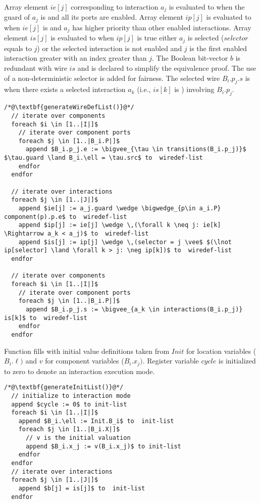 Array element $\mathit{ie}[j]$ corresponding to interaction $a_j$ is evaluated to \true when the guard of $a_j$ is \true and all its ports are enabled.
Array element $ip[j]$ is evaluated to \true when $ie[j]$ is \true and $a_j$ has higher priority than other enabled interactions. 
Array element $is[j]$ is evaluated to \true when $ip[j]$ is true either $a_j$ is selected ($selector$ equals to $j$) or the selected interaction is not enabled and $j$ is the first enabled interaction greater with an index greater than $j$. 
The Boolean bit-vector $b$ is redundant with wire $is$ and is declared to simplify the equivalence proof. 
The use of a non-deterministic selector is added for fairness. 
The selected wire $B_i.p_j.s$ is \true when there exists a selected interaction $a_k$ (i.e., $is[k]$ is \true) involving $B_i.p_j$.
%
\begin{lstlisting}
/*@\textbf{generateWireDefList()}@*/
  // iterate over components
  foreach $i \in [1..|I|]$ 
    // iterate over component ports
    foreach $j \in [1..|B_i.P|]$ 
      append $B_i.p_j.e := \bigvee_{\tau \in transitions(B_i.p_j)}$ $\tau.guard \land B_i.\ell = \tau.src$ to  wiredef-list 
    endfor
  endfor
  
  // iterate over interactions
  foreach $j \in [1..|J|]$ 
    append $ie[j] := a_j.guard \wedge \bigwedge_{p\in a_i.P} component(p).p.e$ to  wiredef-list 
    append $ip[j] := ie[j] \wedge \,(\forall k \neq j: ie[k] \Rightarrow a_k < a_j)$ to  wiredef-list 
    append $is[j] := ip[j] \wedge \,(selector = j \vee$ $(\lnot ip[selector] \land \forall k > j: \neg ip[k])$ to  wiredef-list 
  endfor
  
  // iterate over components
  foreach $i \in [1..|I|]$ 
    // iterate over component ports
    foreach $j \in [1..|B_i.P|]$ 
      append $B_i.p_j.s := \bigvee_{a_k \in interactions(B_i.p_j)} is[k]$ to  wiredef-list 
    endfor
  endfor
\end{lstlisting}

Function  fills  with initial value definitions taken from $\mathit{Init}$ for location variables ($B_i.\ell)$ and $v$ for component variables ($B_i.x_j)$.
Register variable $\mathit{cycle}$ is initialized to zero to denote an interaction execution mode. 

\begin{lstlisting}
/*@\textbf{generateInitList()}@*/
  // initialize to interaction mode
  append $cycle := 0$ to init-list 
  foreach $i \in [1..|I|]$
    append $B_i.\ell := Init.B_i$ to  init-list 
    foreach $j \in [1..|B_i.X|]$
      // v is the initial valuation
      append $B_i.x_j := v(B_i.x_j)$ to init-list  
    endfor
  endfor
  // iterate over interactions
  foreach $j \in [1..|J|]$ 
    append $b[j] = is[j]$ to  init-list 
  endfor
\end{lstlisting}

